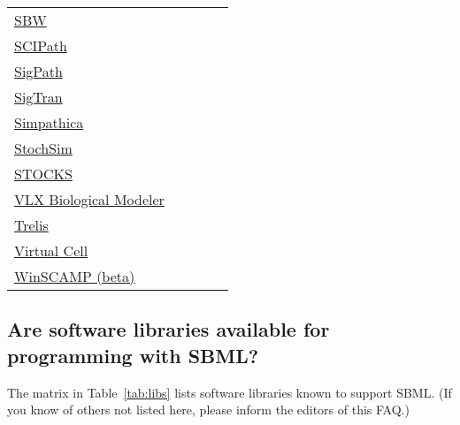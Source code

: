 \documentclass{sbmlfaq}
\newcommand{\yes}{\raisebox{1pt}{\rule{3.5pt}{3.5pt}}}
\newcommand{\yes}{\htmladdimg{sbml-faq-green-dot.gif}}
\begin{document}
\begin{table}[htb]
\begin{tabular}{l!{\hspace{10pt}}c!{\hspace{10pt}}c!{\hspace{10pt}}c!{\hspace{10pt}}c}
    \href{http://www.sbw-sbml.org}{SBW} & \yes & \yes\\
    \href{http://www.ucl.ac.uk/oncology/MicroCore/microcore.htm}{SCIPath} & \yes & \yes & \yes & \yes\\
    \href{http://www.sigpath.org}{SigPath} & \yes & \yes & \yes & \yes\\
    \href{http://csi.washington.edu/teams/modeling/projects/sigtran}{SigTran} & \yes\\
    \href{http://bioinformatics.nyu.edu/Projects/Simpathica/}{Simpathica} & \yes & \yes\\
    \href{http://info.anat.cam.ac.uk/groups/comp-cell/StochSim.html}{StochSim} & & & & \yes\\
    \href{http://www.sysbio.pl/stocks/}{STOCKS}\\
    \href{http://www.teranode.com/products/vlxbiological.php}{VLX Biological Modeler} & \yes & & \yes & \yes\\
    \href{http://www.sourceforge.net/projects/trelis}{Trelis} & \yes & \yes & & \\
    \href{http://www.nrcam.uchc.edu/vcell_development/vcell_dev.html}{Virtual Cell} & \yes & \yes & \yes & \yes\\
    \href{http://www.sys-bio.org/}{WinSCAMP (beta)} & \yes & \yes\\
    \bottomrule
  \end{tabular}
\end{table}


\subsection{Are software libraries available for programming with SBML?}
\label{sec:libraries}

The matrix in Table~\ref{tab:libs} lists software libraries known to
support SBML.  (If you know of others not listed here, please inform the
editors of this FAQ.)
\end{document}

